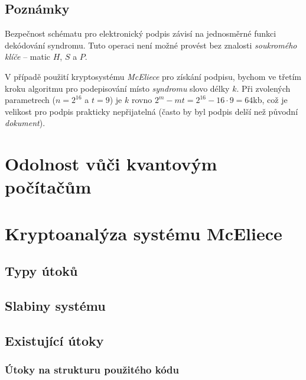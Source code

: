\documentclass[thesis=M,czech,hidelinks]{FITthesis}[2012/06/26]
\newcommand{\0}{{\textcolor[gray]{0.80}{0}}}
\begin{document}
\subsection{Poznámky}
Bezpečnost schématu pro elektronický podpis závisí na jednosměrné funkci
dekódování syndromu. Tuto operaci není možné provést bez znalosti
\emph{soukromého klíče} -- matic $H$, $S$ a $P$.

V případě použití kryptosystému \emph{McEliece} pro získání podpisu, bychom ve
třetím kroku algoritmu pro podepisování místo \emph{syndromu} slovo délky $k$.
Při zvolených parametrech ($n=2^{16}$ a $t=9$) je $k$ rovno $2^m - m t = 2^{16}
- 16 \cdot 9 = 64$\;kb, což je velikost pro podpis prakticky nepřijatelná
(často by byl podpis delší než původní \emph{dokument}).

\vfil

\section{Odolnost vůči kvantovým počítačům}



\section{Kryptoanalýza systému McEliece}
\subsection{Typy útoků}

\subsection{Slabiny systému}

\subsection{Existující útoky}
\subsubsection{Útoky na strukturu použitého kódu}\label{kap_utoky_na_strukturu_kodu}
\end{document}
